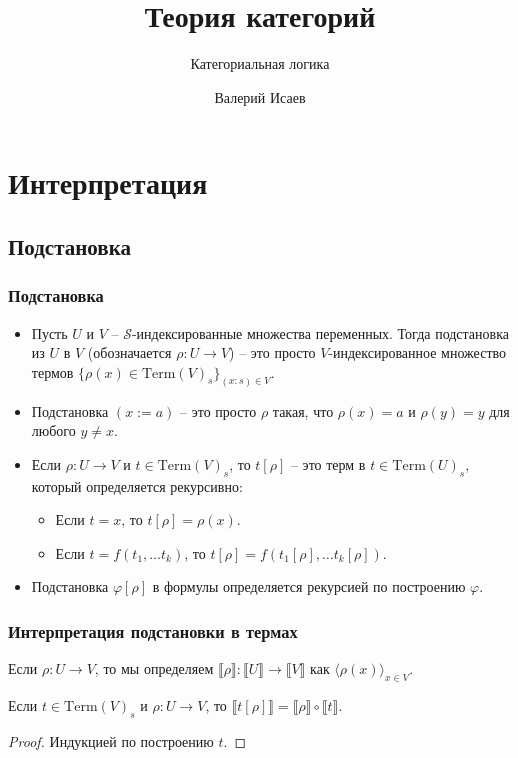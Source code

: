 \documentclass{beamer}
\theoremstyle{definition}
\renewcommand{\ll}{\llbracket}
\newcommand{\rr}{\rrbracket}
\newcommand{\fs}[1]{\mathrm{#1}}
\begin{document}
\title{Теория категорий}
\subtitle{Категориальная логика}
\author{Валерий Исаев}
\maketitle

\section{Интерпретация}

\subsection{Подстановка}

\begin{frame}
\frametitle{Подстановка}
\begin{itemize}
\item Пусть $U$ и $V$ -- $\mathcal{S}$-индексированные множества переменных. Тогда подстановка из $U$ в $V$ (обозначается $\rho : U \to V$) -- это просто $V$-индексированное множество термов $\{ \rho(x) \in \fs{Term}(V)_s \}_{(x : s) \in V}$.
\item Подстановка $(x := a)$ -- это просто $\rho$ такая, что $\rho(x) = a$ и $\rho(y) = y$ для любого $y \neq x$.
\item Если $\rho : U \to V$ и $t \in \fs{Term}(V)_s$, то $t[\rho]$ -- это терм в $t \in \fs{Term}(U)_s$, который определяется рекурсивно:
\begin{itemize}
\item Если $t = x$, то $t[\rho] = \rho(x)$.
\item Если $t = f(t_1, \ldots t_k)$, то $t[\rho] = f(t_1[\rho], \ldots t_k[\rho])$.
\end{itemize}
\item Подстановка $\varphi[\rho]$ в формулы определяется рекурсией по построению $\varphi$.
\end{itemize}
\end{frame}

\begin{frame}
\frametitle{Интерпретация подстановки в термах}
Если $\rho : U \to V$, то мы определяем $\ll \rho \rr : \ll U \rr \to \ll V \rr$ как $\langle \rho(x) \rangle_{x \in V}$.
\begin{lem}
Если $t \in \fs{Term}(V)_s$ и $\rho : U \to V$, то $\ll t[\rho] \rr = \ll \rho \rr \circ \ll t \rr$.
\end{lem}
\begin{proof}
Индукцией по построению $t$.
\end{proof}
\end{frame}
\end{document}
